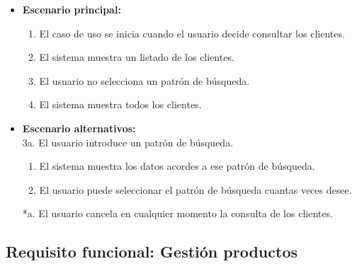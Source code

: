 \begin{itemize}\renewcommand{\labelitemi}{$\circ$}
 \item \textbf{Escenario principal:}
         \begin{enumerate}
          \item El caso de uso se inicia cuando el usuario decide consultar los clientes.
          \item El sistema muestra un listado de los clientes.
          \item El usuario no selecciona un patrón de búsqueda.
          \item El sistema muestra todos los clientes.
         \end{enumerate}
  \item \textbf{Escenario alternativos:}\\
  			3a. El usuario introduce un patrón de búsqueda.
  			\begin{enumerate}
  			\item El sistema muestra los datos acordes a ese patrón de búsqueda.
  			\item El usuario puede seleccionar el patrón de búsqueda cuantas veces desee.
  			\end{enumerate}
          *a. El usuario cancela en cualquier momento la consulta de los clientes.
\end{itemize}

\subsection{Requisito funcional: Gestión productos}

